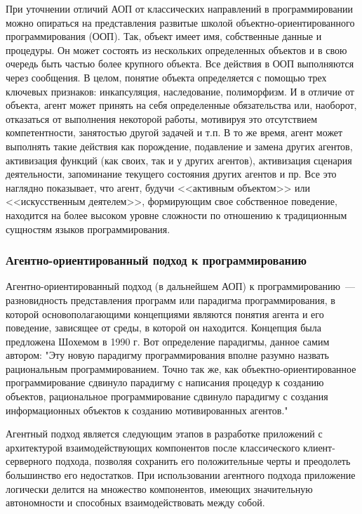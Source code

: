 При уточнении отличий АОП от классических направлений в программировании можно опираться на представления развитые школой объектно-ориентированного программирования (ООП). Так, объект имеет имя, собственные данные и процедуры. Он может состоять из нескольких определенных объектов и в свою очередь быть частью более крупного объекта. Все действия в ООП выполняются через сообщения. В целом, понятие объекта определяется с помощью трех ключевых признаков: инкапсуляция, наследование, полиморфизм. И в отличие от объекта, агент может принять на себя определенные обязательства или, наоборот, отказаться от выполнения некоторой работы, мотивируя это отсутствием компетентности, занятостью другой задачей и т.п. В то же время, агент может выполнять такие действия как порождение, подавление и замена других агентов, активизация функций (как своих, так и у других агентов), активизация сценария деятельности, запоминание текущего состояния других агентов и пр. Все это наглядно показывает, что агент, будучи <<активным объектом>> или <<искусственным деятелем>>, формирующим свое собственное поведение, находится на более высоком уровне сложности по отношению к традиционным сущностям языков программирования.

\subsubsection{Агентно-ориентированный подход к программированию}
Агентно-ориентированный подход (в дальнейшем АОП) к программированию~---  разновидность представления программ или парадигма программирования, в которой основополагающими концепциями являются понятия агента и его поведение, зависящее от среды, в которой он находится. Концепция была предложена Шохемом в 1990 г. Вот определение парадигмы, данное самим автором:
"Эту новую парадигму программирования вполне разумно назвать рациональным программированием. Точно так же, как объектно-ориентированное программирование сдвинуло парадигму с написания процедур к созданию объектов, рациональное программирование сдвинуло парадигму с создания информационных объектов к созданию мотивированных агентов."

Агентный подход является следующим этапов в разработке приложений с архитектурой взаимодействующих компонентов после классического клиент-серверного подхода, позволяя сохранить его положительные черты и преодолеть большинство его недостатков. При использовании агентного подхода приложение логически делится на множество компонентов, имеющих значительную автономности и способных взаимодействовать между собой.

